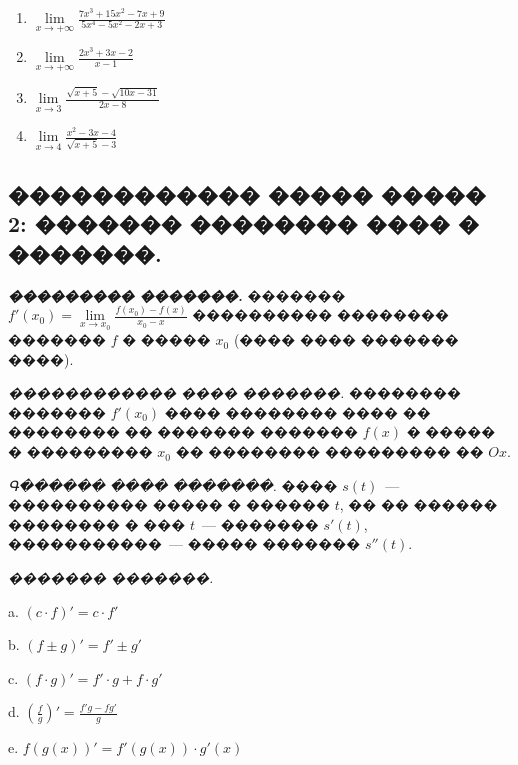 \documentclass[a4paper,12pt]{article}
\begin{document}
\begin{enumerate}
\item $\lim\limits_{x\rightarrow +\infty}^{}\frac{7x^{3}+15x^{2}-7x+9}{5x^{4}-5x^{2}-2x+3}$

\item $\lim\limits_{x\rightarrow +\infty}^{}\frac{2x^{3}+3x-2}{x-1}$

\item $\lim\limits_{x\rightarrow 3}^{}\frac{\sqrt{x+5}-\sqrt{10x-31}}{2x-8}$

\item $\lim\limits_{x\rightarrow 4}^{}\frac{x^{2}-3x-4}{\sqrt{x+5}-3}$
\end{enumerate}







\newpage

\begin{center}
\section*{������������ ����� ����� 2: ������� �������� ���� � �������.}
\end{center}

\quad \textbf{\textit{��������� �������.}} ������� $f'(x_{0})=\lim\limits^{}_{x\rightarrow x_{0}}\frac{f(x_{0})-f(x)}{x_{0}-x}$ ���������� �������� ������� $f$ � ����� $x_{0}$ (���� ���� ������� ����).

\textit{������������ ���� �������.} �������� ������� $f'(x_{0})$ ���� �������� ���� �� �������� �� ������� ������� $f(x)$ � ����� � ��������� $x_{0}$ �� �������� ��������� �� $Ox$.

\textit{Գ������ ���� �������.} ���� $s(t)$~--- ���������� ����� � ������ $t$, �� �� ������ �������� � ��� $t$~--- ������� $s'(t)$, �����������~--- ����� ������� $s''(t)$.

\textit{������� �������.}

a. $(c\cdot f)' = c\cdot f'$

b. $(f\pm g)' = f'\pm g'$

c. $(f\cdot g)' = f'\cdot g + f\cdot g'$

d. $(\frac{f}{g})' = \frac{f'g-fg'}{g}$

e. $f(g(x))' = f'(g(x))\cdot g'(x)$

\medskip\medskip\medskip
\end{document}
